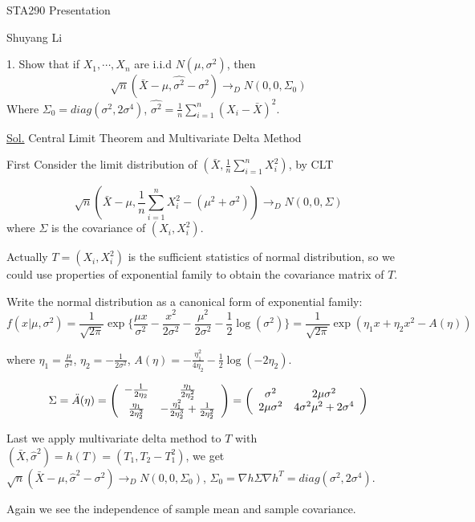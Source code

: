 \documentclass[11pt]{report}
\theoremstyle{definition}
\theoremstyle{remark}
\begin{document}
\begin{center}
    \LARGE{STA290  Presentation}
    
    \vspace{0.5cm}
    \large{Shuyang Li}
\end{center}
\vspace{1cm}
\begin{flushleft}
1. Show that if $X_1,\cdots,X_n$ are i.i.d $N(\mu,\sigma^2)$, then
\[\sqrt{n}(\bar{X}-\mu,\hat{\sigma^2}-\sigma^2) \rightarrow_D N(0,0,\Sigma_0) \]
Where $\Sigma_0=diag(\sigma^2,2\sigma^4)$, $\hat{\sigma^2}=\frac{1}{n}\sum_{i=1}^{n}(X_i-\bar{X})^2$.

\vspace{1.5cm}
\underline{Sol.} Central Limit Theorem and Multivariate Delta Method

First Consider the limit distribution of $(\bar{X},\frac{1}{n}\sum_{i=1}^{n}X_i^2)$, by CLT

\[\sqrt{n}(\bar{X}-\mu,\frac{1}{n}\sum_{i=1}^{n}X_i^2-(\mu^2+\sigma^2))\rightarrow_D N(0,0,\Sigma)\] where $\Sigma$ is the covariance of $(X_i,X_i^2)$.

Actually $T=(X_i,X_i^2)$ is the sufficient statistics of normal distribution, so we could use properties of exponential family to obtain the covariance matrix of $T$.

Write the normal distribution as a canonical form of exponential family:
\[f(x|\mu,\sigma^2)=\frac{1}{\sqrt{2\pi}}\exp\{\frac{\mu x}{\sigma^2}-\frac{x^2}{2\sigma^2}-\frac{\mu^2}{2\sigma^2}-\frac{1}{2}\log(\sigma^2)\}=\frac{1}{\sqrt{2\pi}}\exp(\eta_1 x+\eta_2x^2-A(\eta))\]

where $\eta_1=\frac{\mu}{\sigma^2}$, $\eta_2=- \frac{1}{2\sigma^2}$, $A(\eta)=-\frac{\eta_1^2}{4\eta_2}-\frac{1}{2}\log(-2\eta_2)$.

\[\Sigma=\ddot{A}(\eta)=\left(\begin{array}{c c}
-\frac{1}{2\eta_2} & \frac{\eta_1}{2\eta_2^2}\\
\frac{\eta_1}{2\eta_2^2} & -\frac{\eta_1^2}{2\eta_2^3}+\frac{1}{2\eta_2^2}\\
\end{array}
\right)=\left(
\begin{array}{cc}
\sigma^2 & 2\mu\sigma^2\\
2\mu\sigma^2 & 4\sigma^2\mu^2+2\sigma^4

\end{array}\right)\]

Last we apply multivariate delta method to $T$ with $(\bar{X},\hat{\sigma}^2)=h(T)=(T_1,T_2-T_1^2)$, we get $\sqrt{n}(\bar{X}-\mu,\hat{\sigma}^2-\sigma^2)\rightarrow_D N(0,0,\Sigma_0)$,  $\Sigma_0=\nabla h \Sigma \nabla h^T = diag(\sigma^2,2\sigma^4)$.

Again we see the independence of sample mean and sample covariance.

\end{flushleft}
\end{document}
